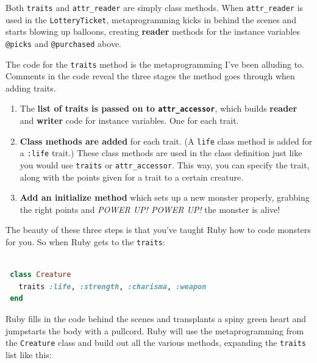 \documentclass[10pt,twoside]{report}
\begin{document}
Both \lstinline[breaklines=true]|traits| and
\lstinline[breaklines=true]|attr_reader| are simply class methods.
When \lstinline[breaklines=true]|attr_reader| is used in the
\lstinline[breaklines=true]|LotteryTicket|, metaprogramming kicks in
behind the scenes and starts blowing up balloons, creating {\bf
  reader} methods for the instance variables
\lstinline[breaklines=true]|@picks| and
\lstinline[breaklines=true]|@purchased| above.

The code for the \lstinline[breaklines=true]|traits| method is the
metaprogramming I've been alluding to. Comments in the code reveal the
three stages the method goes through when adding traits.

\begin{enumerate}
\item The {\bf list of traits is passed on to
  \lstinline[breaklines=true]|attr_accessor|}, which builds {\bf
  reader} and {\bf writer} code for instance variables.  One for each
  trait.
\item {\bf Class methods are added} for each trait.  (A
  \lstinline[breaklines=true]|life| class method is added for a
  \lstinline[breaklines=true]|:life| trait.)  These class methods are
  used in the class definition just like you would use
  \lstinline[breaklines=true]|traits| or
  \lstinline[breaklines=true]|attr_accessor|.  This way, you can
  specify the trait, along with the points given for a trait to a
  certain creature.
\item {\bf Add an initialize method} which sets up a new monster
  properly, grabbing the right points and {\em POWER UP! POWER UP!}
  the monster is alive!
\end{enumerate}

The beauty of these three steps is that you've taught Ruby how to code
monsters for you.  So when Ruby gets to the
\lstinline[breaklines=true]|traits|:


\begin{lstlisting}[basicstyle=\ttfamily\color{basiccolor},
    commentstyle = \ttfamily\color{commentcolor},
    keywordstyle=\ttfamily\color{keywordscolor},
    stringstyle=\color{stringcolor},
    language=Ruby,
    basicstyle=\small\ttfamily,
    showstringspaces=false,
  ]

 class Creature
   traits :life, :strength, :charisma, :weapon
 end

\end{lstlisting}


Ruby fills in the code behind the scenes and transplants a spiny green
heart and jumpstarts the body with a pullcord. Ruby will use the
metaprogramming from the \lstinline[breaklines=true]|Creature| class
and build out all the various methods, expanding the
\lstinline[breaklines=true]|traits| list like this:
\end{document}
